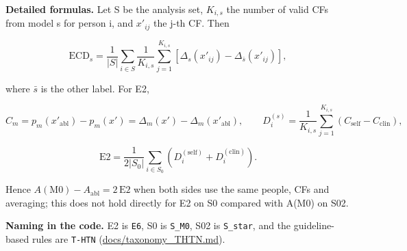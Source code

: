 \documentclass[
  11pt,
]{article}
\begin{document}
\textbf{Detailed formulas.} Let S be the analysis set, \(K_{i,s}\) the
number of valid CFs from model s for person i, and \(x'_{ij}\) the j-th
CF. Then

\[\mathrm{ECD}_s = \frac{1}{|S|}\sum_{i \in S}\frac{1}{K_{i,s}}\sum_{j=1}^{K_{i,s}}\left[\Delta_s(x'_{ij}) - \Delta_{\bar s}(x'_{ij})\right],\]

where \(\bar s\) is the other label. For E2,

\[C_m = p_m(x'_{\mathrm{abl}}) - p_m(x') = \Delta_m(x') - \Delta_m(x'_{\mathrm{abl}}), \qquad D_i^{(s)} = \frac{1}{K_{i,s}}\sum_{j=1}^{K_{i,s}}\left(C_{\mathrm{self}} - C_{\mathrm{clin}}\right),\]

\[\mathrm{E2} = \frac{1}{2|S_0|}\sum_{i \in S_0}\left(D_i^{(\mathrm{self})} + D_i^{(\mathrm{clin})}\right).\]

Hence \(A(\mathrm{M0}) - A_{\mathrm{abl}} = 2\,\mathrm{E2}\) when both
sides use the same people, CFs and averaging; this does not hold
directly for E2 on S0 compared with A(M0) on S02.

\textbf{Naming in the code.} E2 is \texttt{E6}, S0 is \texttt{S\_M0},
S02 is \texttt{S\_star}, and the guideline-based rules are
\texttt{T-HTN} (\url{docs/taxonomy_THTN.md}).
\end{document}
